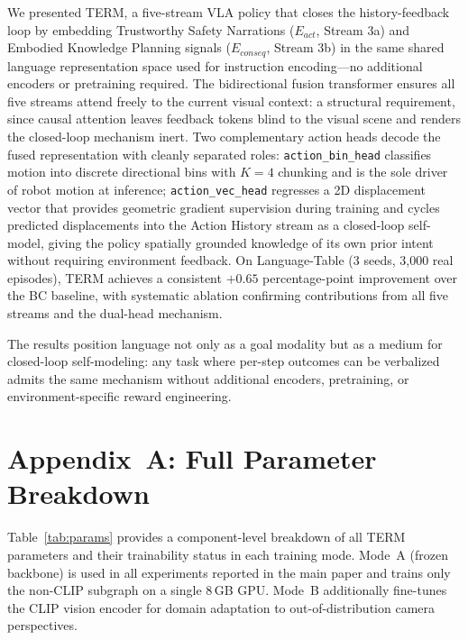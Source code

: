\documentclass[letterpaper]{article} %
\begin{document}
We presented TERM, a five-stream VLA policy that closes the history-feedback loop by embedding Trustworthy Safety Narrations ($E_{act}$, Stream 3a) and Embodied Knowledge Planning signals ($E_{conseq}$, Stream 3b) in the same shared language representation space used for instruction encoding---no additional encoders or pretraining required. The bidirectional fusion transformer ensures all five streams attend freely to the current visual context: a structural requirement, since causal attention leaves feedback tokens blind to the visual scene and renders the closed-loop mechanism inert. Two complementary action heads decode the fused representation with cleanly separated roles: \texttt{action\_bin\_head} classifies motion into discrete directional bins with $K{=}4$ chunking and is the sole driver of robot motion at inference; \texttt{action\_vec\_head} regresses a 2D displacement vector that provides geometric gradient supervision during training and cycles predicted displacements into the Action History stream as a closed-loop self-model, giving the policy spatially grounded knowledge of its own prior intent without requiring environment feedback. On Language-Table (3 seeds, 3,000 real episodes), TERM achieves a consistent $+0.65$ percentage-point improvement over the BC baseline, with systematic ablation confirming contributions from all five streams and the dual-head mechanism.

The results position language not only as a goal modality but as a medium for closed-loop self-modeling: any task where per-step outcomes can be verbalized admits the same mechanism without additional encoders, pretraining, or environment-specific reward engineering.




\clearpage


\section*{Appendix~A: Full Parameter Breakdown}

Table~\ref{tab:params} provides a component-level breakdown of all TERM parameters and their trainability status in each training mode. Mode~A (frozen backbone) is used in all experiments reported in the main paper and trains only the non-CLIP subgraph on a single 8\,GB GPU. Mode~B additionally fine-tunes the CLIP vision encoder for domain adaptation to out-of-distribution camera perspectives.
\end{document}
